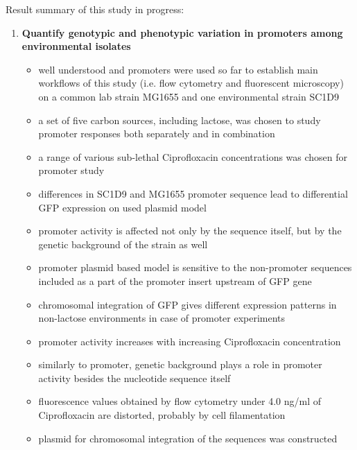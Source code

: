 \bigbreak
Result summary of this study in progress:
\begin{enumerate}[font=\bfseries]

	\item \textbf{Quantify genotypic and phenotypic variation in promoters among environmental  isolates}
	
	\begin{itemize}
	
		\item well understood  and  promoters were used so far to establish main workflows of this study (i.e. flow cytometry and fluorescent microscopy) on a common lab strain MG1655 and one environmental strain SC1\textunderscore D9
		\item a set of five carbon sources, including lactose, was chosen to study  promoter responses both separately and in combination
		\item a range of various sub-lethal Ciprofloxacin concentrations was chosen for  promoter study
		\item differences in SC1\textunderscore D9 and MG1655  promoter sequence lead to differential GFP expression on used plasmid model
		\item {} promoter activity is affected not only by the sequence itself, but by the genetic background of the strain as well
		\item {} promoter plasmid based model is sensitive to the non-promoter sequences included as a part of the promoter insert upstream of GFP gene
		\item chromosomal integration of GFP gives different expression patterns in non-lactose environments in case of  promoter experiments
		\item {} promoter activity increases with increasing Ciprofloxacin concentration
		\item similarly to  promoter, genetic background plays a role in  promoter activity besides the nucleotide sequence itself
		\item fluorescence values obtained by flow cytometry under 4.0 ng/ml of Ciprofloxacin are distorted, probably by cell filamentation
		\item plasmid for chromosomal integration of the  sequences was constructed
	
	\end{itemize}

\end{enumerate} 

